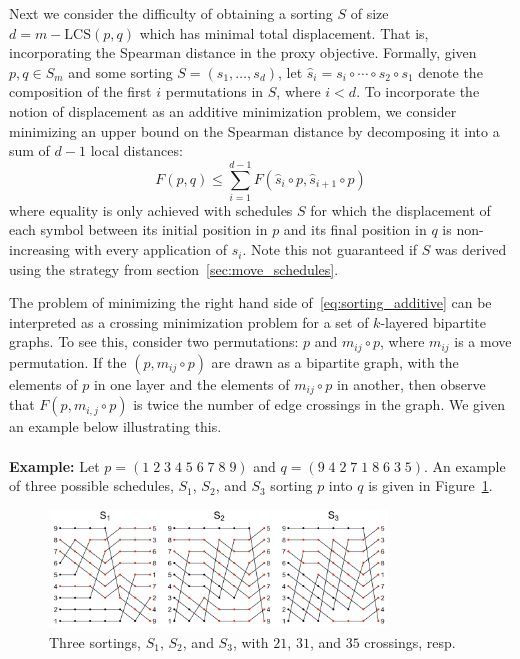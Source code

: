 \documentclass[sn-mathphys]{sn-jnl}
\begin{document}
Next we consider the difficulty of obtaining a sorting $S$ of size $d = m - \mathrm{LCS}(p,q)$ which has minimal total displacement. 
That is, incorporating the Spearman distance in the proxy objective. 
Formally, given $p, q \in S_m$ and some sorting  $S = (s_1, \dots, s_d)$, let $\hat{s}_i =  s_i \circ \cdots \circ s_2 \circ s_1$ denote the composition of the first $i$ permutations in $S$, where $i < d$. To incorporate the notion of displacement as an additive minimization problem, we consider minimizing an upper bound on the Spearman distance by decomposing it into a sum of $d-1$ local distances:
\begin{equation}\label{eq:sorting_additive}
F(p, q) \leq \sum\limits_{i=1}^{d-1} F(\hat{s}_i \circ p, \hat{s}_{i+1} \circ p)
\end{equation}
where equality is only achieved with schedules $S$ for which the displacement of each symbol between its initial position in $p$ and its final position in $q$ is non-increasing with every application of $s_i$. Note this not guaranteed if $S$ was derived using the strategy from section~\ref{sec:move_schedules}.

The problem of minimizing the right hand side of~\eqref{eq:sorting_additive} can be interpreted as a crossing minimization problem for a set of $k$-layered bipartite graphs. To see this, consider two permutations: $p$ and $m_{ij} \circ p$, where $m_{ij}$ is a move permutation. If the $(p, m_{ij} \circ p)$ are drawn as a bipartite graph, with the elements of $p$ in one layer and the elements of $m_{ij} \circ p$ in another, then observe that $F(p, m_{i,j} \circ p)$ is twice the number of edge crossings in the graph. We given an example below illustrating this. 
\\
\\
\noindent \textbf{Example:} 
Let  $p= (1\;2\;3\;4\;5\;6\;7\;8\;9)$ 
and 
$q = (9\;4\;2\;7\;1\;8\;6\;3\;5)$.
An example of three possible schedules, $S_1$, $S_2$, and $S_3$ sorting $p$ into $q$ is given in Figure~\ref{fig:crossings}. 
\begin{figure}[!htb]
    \centering
    \includegraphics[width=0.80\textwidth]{crossings.png}
    \caption{Three sortings, $S_1$, $S_2$, and $S_3$, with $21$, $31$, and $35$ crossings, resp.}
    \label{fig:crossings}
\end{figure}
\end{document}
